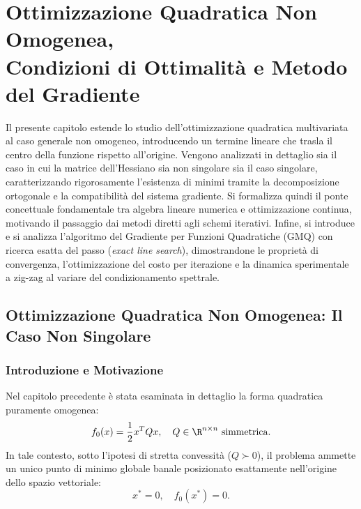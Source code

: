 \chapter[Ottimizzazione Quadratica Non Omogenea e GMQ]{Ottimizzazione Quadratica Non Omogenea,\\Condizioni di Ottimalit\`a e Metodo del Gradiente}
\label{chap:ottimizzazione-quadratica-non-omogenea-gmq}

Il presente capitolo estende lo studio dell'ottimizzazione quadratica multivariata al caso generale non omogeneo, introducendo un termine lineare che trasla il centro della funzione rispetto all'origine. Vengono analizzati in dettaglio sia il caso in cui la matrice dell'Hessiano sia non singolare sia il caso singolare, caratterizzando rigorosamente l'esistenza di minimi tramite la decomposizione ortogonale e la compatibilit\`a del sistema gradiente. Si formalizza quindi il ponte concettuale fondamentale tra algebra lineare numerica e ottimizzazione continua, motivando il passaggio dai metodi diretti agli schemi iterativi. Infine, si introduce e si analizza l'algoritmo del Gradiente per Funzioni Quadratiche (GMQ) con ricerca esatta del passo (\textit{exact line search}), dimostrandone le propriet\`a di convergenza, l'ottimizzazione del costo per iterazione e la dinamica sperimentale a zig-zag al variare del condizionamento spettrale.

\FloatBarrier
\section{Ottimizzazione Quadratica Non Omogenea: Il Caso Non Singolare}
\label{sec:quadratica-non-omogenea-non-singolare}

\subsection{Introduzione e Motivazione}
Nel capitolo precedente \`e stata esaminata in dettaglio la forma quadratica puramente omogenea:
\begin{equation}
    f_0(x) = \frac{1}{2} x^T Q x, \quad Q \in \R^{n \times n} \text{ simmetrica}.
\end{equation}
In tale contesto, sotto l'ipotesi di stretta convessit\`a ($Q \succ 0$), il problema ammette un unico punto di minimo globale banale posizionato esattamente nell'origine dello spazio vettoriale:
\begin{equation}
    x^* = 0, \quad f_0(x^*) = 0.
\end{equation}

